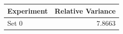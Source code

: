 \begin{tabular}{lr}
\toprule
Experiment & Relative Variance \\
\midrule
Set 0 & 7.8663 \\
\bottomrule
\end{tabular}
